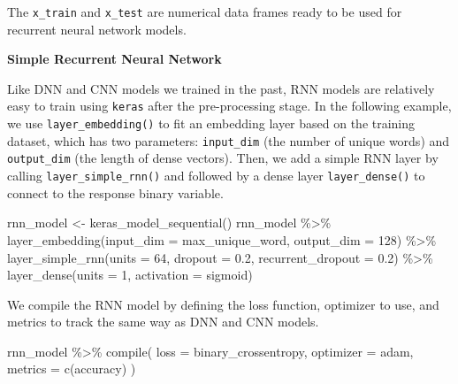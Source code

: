 \documentclass[
  12pt,
]{krantz}
\makeatletter
\newenvironment{Shaded}{\begin{snugshade}}{\end{snugshade}}
\newcommand{\AttributeTok}[1]{\textcolor[rgb]{0.61,0.61,0.61}{#1}}
\newcommand{\DecValTok}[1]{\textcolor[rgb]{0.06,0.06,0.06}{#1}}
\newcommand{\FloatTok}[1]{\textcolor[rgb]{0.06,0.06,0.06}{#1}}
\newcommand{\FunctionTok}[1]{\textcolor[rgb]{0,0,0}{#1}}
\newcommand{\NormalTok}[1]{#1}
\newcommand{\OtherTok}[1]{\textcolor[rgb]{0.37,0.37,0.37}{#1}}
\newcommand{\SpecialCharTok}[1]{\textcolor[rgb]{0,0,0}{#1}}
\newcommand{\StringTok}[1]{\textcolor[rgb]{0.5,0.5,0.5}{#1}}
\newenvironment{kframe}{%
\medskip{}
\setlength{\fboxsep}{.8em}
 \def\at@end@of@kframe{}%
 \ifinner\ifhmode%
  \def\at@end@of@kframe{\end{minipage}}%
  \begin{minipage}{\columnwidth}%
 \fi\fi%
 \def\FrameCommand##1{\hskip\@totalleftmargin \hskip-\fboxsep
 \colorbox{shadecolor}{##1}\hskip-\fboxsep
     \hskip-\linewidth \hskip-\@totalleftmargin \hskip\columnwidth}%
 \MakeFramed {\advance\hsize-\width
   \@totalleftmargin\z@ \linewidth\hsize
   \@setminipage}}%
 {\par\unskip\endMakeFramed%
 \at@end@of@kframe}
\renewenvironment{Shaded}{\begin{kframe}}{\end{kframe}}
\makeatother
\begin{document}
The \texttt{x\_train} and \texttt{x\_test} are numerical data frames ready to be used for recurrent neural network models.

\textbf{Simple Recurrent Neural Network}

Like DNN and CNN models we trained in the past, RNN models are relatively easy to train using \texttt{keras} after the pre-processing stage. In the following example, we use \texttt{layer\_embedding()} to fit an embedding layer based on the training dataset, which has two parameters: \texttt{input\_dim} (the number of unique words) and \texttt{output\_dim} (the length of dense vectors). Then, we add a simple RNN layer by calling \texttt{layer\_simple\_rnn()} and followed by a dense layer \texttt{layer\_dense()} to connect to the response binary variable.

\begin{Shaded}
\begin{Highlighting}[]
\NormalTok{rnn\_model }\OtherTok{\textless{}{-}} \FunctionTok{keras\_model\_sequential}\NormalTok{()}
\NormalTok{rnn\_model }\SpecialCharTok{\%\textgreater{}\%}
  \FunctionTok{layer\_embedding}\NormalTok{(}\AttributeTok{input\_dim =}\NormalTok{ max\_unique\_word, }\AttributeTok{output\_dim =} \DecValTok{128}\NormalTok{) }\SpecialCharTok{\%\textgreater{}\%}
  \FunctionTok{layer\_simple\_rnn}\NormalTok{(}\AttributeTok{units =} \DecValTok{64}\NormalTok{, }\AttributeTok{dropout =} \FloatTok{0.2}\NormalTok{,}
                   \AttributeTok{recurrent\_dropout =} \FloatTok{0.2}\NormalTok{) }\SpecialCharTok{\%\textgreater{}\%}
  \FunctionTok{layer\_dense}\NormalTok{(}\AttributeTok{units =} \DecValTok{1}\NormalTok{, }\AttributeTok{activation =} \StringTok{\textquotesingle{}sigmoid\textquotesingle{}}\NormalTok{)}
\end{Highlighting}
\end{Shaded}

We compile the RNN model by defining the loss function, optimizer to use, and metrics to track the same way as DNN and CNN models.

\begin{Shaded}
\begin{Highlighting}[]
\NormalTok{rnn\_model }\SpecialCharTok{\%\textgreater{}\%} \FunctionTok{compile}\NormalTok{(}
  \AttributeTok{loss =} \StringTok{\textquotesingle{}binary\_crossentropy\textquotesingle{}}\NormalTok{,}
  \AttributeTok{optimizer =} \StringTok{\textquotesingle{}adam\textquotesingle{}}\NormalTok{,}
  \AttributeTok{metrics =} \FunctionTok{c}\NormalTok{(}\StringTok{\textquotesingle{}accuracy\textquotesingle{}}\NormalTok{)}
\NormalTok{)}
\end{Highlighting}
\end{Shaded}
\end{document}
